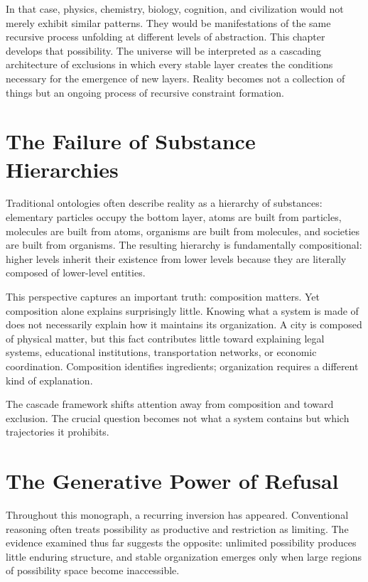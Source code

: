 \documentclass[11pt,oneside]{book}
\theoremstyle{plain}
\theoremstyle{definition}
\theoremstyle{remark}
\begin{document}
In that case, physics, chemistry, biology, cognition, and civilization would not merely exhibit similar patterns. They would be manifestations of the same recursive process unfolding at different levels of abstraction. This chapter develops that possibility. The universe will be interpreted as a cascading architecture of exclusions in which every stable layer creates the conditions necessary for the emergence of new layers. Reality becomes not a collection of things but an ongoing process of recursive constraint formation.

\section{The Failure of Substance Hierarchies}

Traditional ontologies often describe reality as a hierarchy of substances: elementary particles occupy the bottom layer, atoms are built from particles, molecules are built from atoms, organisms are built from molecules, and societies are built from organisms. The resulting hierarchy is fundamentally compositional: higher levels inherit their existence from lower levels because they are literally composed of lower-level entities.

This perspective captures an important truth: composition matters. Yet composition alone explains surprisingly little. Knowing what a system is made of does not necessarily explain how it maintains its organization. A city is composed of physical matter, but this fact contributes little toward explaining legal systems, educational institutions, transportation networks, or economic coordination. Composition identifies ingredients; organization requires a different kind of explanation.

The cascade framework shifts attention away from composition and toward exclusion. The crucial question becomes not what a system contains but which trajectories it prohibits.

\section{The Generative Power of Refusal}

Throughout this monograph, a recurring inversion has appeared. Conventional reasoning often treats possibility as productive and restriction as limiting. The evidence examined thus far suggests the opposite: unlimited possibility produces little enduring structure, and stable organization emerges only when large regions of possibility space become inaccessible.
\end{document}
